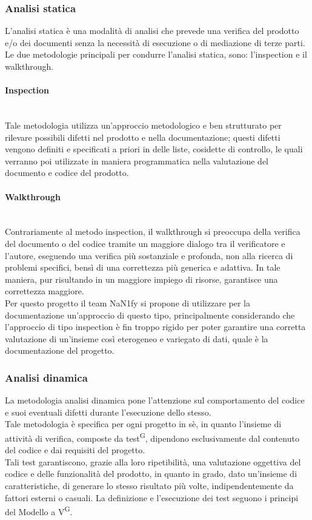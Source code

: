 \documentclass[8pt]{article}
\newcommand{\glossterm}[1]{#1\textsuperscript{G}} %
\newcommand{\subsubsubsection}[1]{\paragraph{#1}\mbox{}\\}
\begin{document}
\subsubsection{Analisi statica}
L'analisi statica è una modalità di analisi che prevede una verifica del prodotto e/o dei documenti senza la necessità di esecuzione o di mediazione di terze parti. \\
Le due metodologie principali per condurre l'analisi statica, sono: l'inspection e il walkthrough.

\subsubsubsection{Inspection}
Tale metodologia utilizza un'approccio metodologico e ben strutturato per rilevare possibili difetti nel prodotto e nella documentazione; questi difetti vengono definiti e specificati a priori in delle liste, cosidette di controllo, le quali verranno poi utilizzate in maniera programmatica nella valutazione del documento e codice del prodotto.

\subsubsubsection{Walkthrough}
Contrariamente al metodo inspection, il walkthrough si preoccupa della verifica del documento o del codice tramite un maggiore dialogo tra il verificatore e l'autore, eseguendo una verifica più sostanziale e profonda, non alla ricerca di problemi specifici, bensì di una correttezza più generica e adattiva. In tale maniera, pur risultando in un maggiore impiego di risorse, garantisce una correttezza maggiore. \\
Per questo progetto il team NaN1fy si propone di utilizzare per la documentazione un'approccio di questo tipo, principalmente considerando che l'approccio di tipo inspection è fin troppo rigido per poter garantire una corretta valutazione di un'insieme così eterogeneo e variegato di dati, quale è la documentazione del progetto.

\subsubsection{Analisi dinamica}
La metodologia analisi dinamica pone l'attenzione sul comportamento del codice e suoi eventuali difetti durante l'esecuzione dello stesso. \\
Tale metodologia è specifica per ogni progetto in sè, in quanto l'insieme di attività di verifica, composte da \glossterm{test}, dipendono esclusivamente dal contenuto del codice e dai requisiti del progetto. \\
Tali test garantiscono, grazie alla loro ripetibilità, una valutazione oggettiva del codice e delle funzionalità del prodotto, in quanto in grado, dato un'insieme di caratteristiche, di generare lo stesso risultato più volte, indipendentemente da fattori esterni o casuali.
La definizione e l'esecuzione dei test seguono i principi del \glossterm{Modello a V}.
\end{document}
